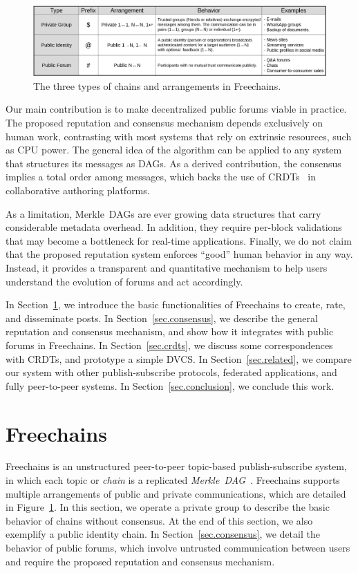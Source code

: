 \documentclass[10pt,journal,compsoc]{IEEEtran}
\newcommand{\FC}       {Freechains\xspace}
\begin{document}
\begin{figure}
\centering
\includegraphics[width=\textwidth]{arrangements.png}
\caption{The three types of chains and arrangements in \FC.}
\label{fig.table}
\end{figure}

Our main contribution is to make decentralized public forums viable in
practice.
The proposed reputation and consensus mechanism depends exclusively on human
work, contrasting with most systems that rely on extrinsic resources, such as
CPU power.
The general idea of the algorithm can be applied to any system that structures
its messages as DAGs.
As a derived contribution, the consensus implies a total order among messages,
which backs the use of CRDTs~\cite{p2p.merkle-crdts} in collaborative authoring
platforms.

As a limitation, Merkle~DAGs are ever growing data structures that carry
considerable metadata overhead.
In addition, they require per-block validations that may become a bottleneck
for real-time applications.
%
Finally, we do not claim that the proposed reputation system enforces ``good''
human behavior in any way.
Instead, it provides a transparent and quantitative mechanism to help users
understand the evolution of forums and act accordingly.

In Section~\ref{sec.freechains}, we introduce the basic functionalities of \FC
to create, rate, and disseminate posts.
In Section~\ref{sec.consensus}, we describe the general reputation and
consensus mechanism, and show how it integrates with public forums in \FC.
In Section~\ref{sec.crdts}, we discuss some correspondences with CRDTs, and
prototype a simple DVCS.
In Section~\ref{sec.related}, we compare our system with other
publish-subscribe protocols, federated applications, and fully
peer-to-peer systems.
In Section~\ref{sec.conclusion}, we conclude this work.

\section{\FC}
\label{sec.freechains}

\FC is an unstructured peer-to-peer topic-based publish-subscribe system, in
which each topic or \emph{chain} is a replicated
\emph{Merkle~DAG}~\cite{fcs.sbseg20}.
\FC supports multiple arrangements of public and private communications, which
are detailed in Figure~\ref{fig.table}.
In this section, we operate a private group to describe the basic behavior of
chains without consensus.
At the end of this section, we also exemplify a public identity chain.
In Section~\ref{sec.consensus}, we detail the behavior of public forums, which
involve untrusted communication between users and require the proposed
reputation and consensus mechanism.
\end{document}
